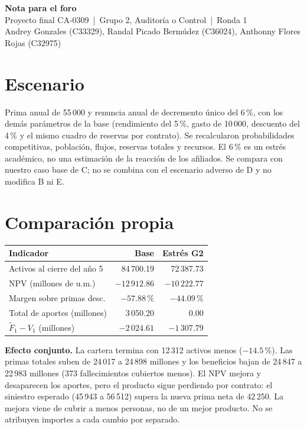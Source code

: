 \documentclass[11pt,a4paper]{article}
\begin{document}
\begin{center}
{\Large\bfseries Nota para el foro}\\[3pt]
{\normalsize Proyecto final CA-0309 \,|\, Grupo 2, Auditoría o Control \,|\, Ronda 1}\\[2pt]
{\small Andrey Gonzales (C33329), Randal Picado Bermúdez (C36024), Anthonny Flores Rojas (C32975)}
\end{center}

\section*{Escenario}
Prima anual de 55\,000 y renuncia anual de decremento único del 6\,\%, con los demás parámetros de
la base (rendimiento del 5\,\%, gasto de 10\,000, descuento del 4\,\% y el mismo cuadro de reservas
por contrato). Se recalcularon probabilidades competitivas, población, flujos, reservas totales y
recursos. El 6\,\% es un estrés académico, no una estimación de la reacción de los afiliados. Se
compara con nuestro caso base de C; no se combina con el escenario adverso de D y no modifica B ni E.

\section*{Comparación propia}
\begin{minipage}[t]{0.50\textwidth}
\vspace{0pt}
\centering\small
\begin{tabular}{lrr}
\toprule
Indicador & Base & Estrés G2\\
\midrule
Activos al cierre del año 5 & 84\,700.19 & 72\,387.73\\
NPV (millones de u.m.) & $-12\,912.86$ & $-10\,222.77$\\
Margen sobre primas desc. & $-57.88\,\%$ & $-44.09\,\%$\\
Total de aportes (millones) & 3\,050.20 & 0.00\\
$\tilde F_1 - V_1$ (millones) & $-2\,024.61$ & $-1\,307.79$\\
\bottomrule
\end{tabular}
\end{minipage}\hfill
\begin{minipage}[t]{0.47\textwidth}
\vspace{0pt}
\small
\textbf{Efecto conjunto.} La cartera termina con 12\,312 activos menos ($-14.5\,\%$). Las primas
totales suben de 24\,017 a 24\,898 millones y los beneficios bajan de 24\,847 a 22\,983 millones
(373 fallecimientos cubiertos menos). El NPV mejora y desaparecen los aportes, pero el producto
sigue perdiendo por contrato: el siniestro esperado (45\,943 a 56\,512) supera la nueva prima neta
de 42\,250. La mejora viene de cubrir a menos personas, no de un mejor producto. No se atribuyen
importes a cada cambio por separado.
\end{minipage}
\end{document}
